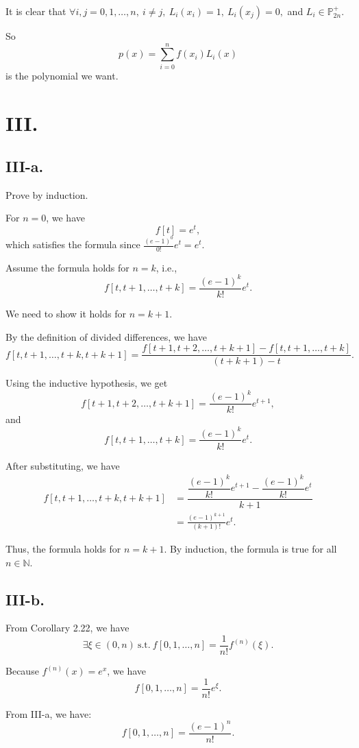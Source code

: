 \documentclass[a4paper]{article}
\begin{document}
It is clear that $\forall i, j = 0, 1,\dots, n,\ i \not = j,\ L_{i}(x_i) = 1,\ L_{i}(x_j) = 0,$ and $L_{i} \in \mathbb{P}^{+}_{2n}$.

So 
$$
p(x) = \sum_{i=0}^{n} f(x_i) L_{i}(x)
$$ 
is the polynomial we want.

\section*{III.}

\subsection*{III-a.}
Prove by induction.

For $n = 0$, we have
$$
  f[t] = e^t,
$$
which satisfies the formula since $\frac{(e - 1)^0}{0!} e^t = e^t$.

Assume the formula holds for $n = k$, i.e.,
$$
  f[t, t + 1, \ldots, t + k] = \frac{(e - 1)^k}{k!} e^t.
$$

We need to show it holds for $n = k + 1$.

By the definition of divided differences, we have
$$
  f[t, t + 1, \ldots, t + k, t + k + 1] = \frac{f[t + 1, t + 2, \ldots, t + k + 1] - f[t, t + 1, \ldots, t + k]}{(t + k + 1) - t}.
$$

Using the inductive hypothesis, we get
$$
  f[t + 1, t + 2, \ldots, t + k + 1] = \frac{(e - 1)^k}{k!} e^{t + 1},
$$
and
$$
  f[t, t + 1, \ldots, t + k] = \frac{(e - 1)^k}{k!} e^t.
$$

After substituting, we have
$$\begin{aligned}
  f[t, t + 1, \ldots, t + k, t + k + 1] &= \dfrac{\dfrac{(e - 1)^k}{k!} e^{t + 1} - \dfrac{(e - 1)^k}{k!} e^t}{k + 1}\\
  &= \frac{(e - 1)^{k + 1}}{(k + 1)!} e^t.
\end{aligned}
$$

Thus, the formula holds for $n = k + 1$. By induction, the formula is true for all $n \in \mathbb{N}$.

\subsection*{III-b.}
From Corollary 2.22, we have
$$
\exists \xi\in(0,n)\ \text{s.t.}\  f[0, 1, \ldots, n] = \frac{1}{n!} f^{(n)}(\xi).
$$

Because $f^{(n)}(x) = e^x$, we have
$$
  f[0, 1, \ldots, n] = \frac{1}{n!} e^\xi.
$$

From III-a, we have:
$$
  f[0, 1, \ldots, n] = \frac{(e - 1)^n}{n!}.
$$
\end{document}

